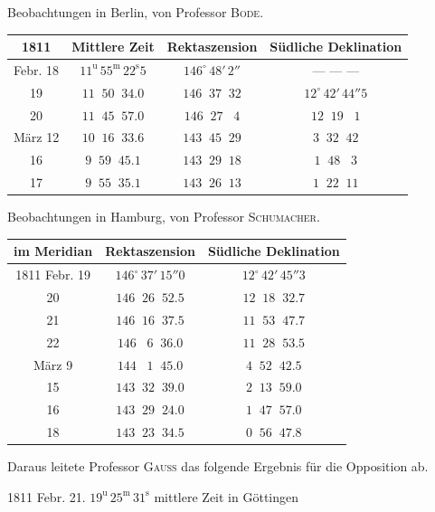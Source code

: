 \begin{center}\fontsize{10}{12}\selectfont\setlength{\tabcolsep}{4pt}\renewcommand{\arraystretch}{1.15}
Beobachtungen in Berlin, von Professor \textsc{Bode}.

\begin{tabular}{c|c|c|c}
1811 & Mittlere Zeit & Rektaszension & Südliche Deklination \\
\hline
Febr. 18 & $11^{\mathrm u}\,55^{\mathrm m}\,22^{\mathrm s}5$ & $146^\circ\,48'\,2''$ & --- --- --- \\
19 & $11\;\;50\;\;34.0$ & $146\;\;37\;\;32$ & $12^\circ\,42'\,44''5$ \\
20 & $11\;\;45\;\;57.0$ & $146\;\;27\;\;\;4$ & $12\;\;19\;\;\;1$ \\
März 12 & $10\;\;16\;\;33.6$ & $143\;\;45\;\;29$ & $3\;\;32\;\;42$ \\
16 & $9\;\;59\;\;45.1$ & $143\;\;29\;\;18$ & $1\;\;48\;\;\;3$ \\
17 & $9\;\;55\;\;35.1$ & $143\;\;26\;\;13$ & $1\;\;22\;\;11$ \\
\end{tabular}
\end{center}

\begin{center}\fontsize{10}{12}\selectfont\setlength{\tabcolsep}{4pt}\renewcommand{\arraystretch}{1.15}
Beobachtungen in Hamburg, von Professor \textsc{Schumacher}.

\begin{tabular}{c|c|c}
im Meridian & Rektaszension & Südliche Deklination \\
\hline
1811 Febr. 19 & $146^\circ\,37'\,15''0$ & $12^\circ\,42'\,45''3$ \\
20 & $146\;\;26\;\;52.5$ & $12\;\;18\;\;32.7$ \\
21 & $146\;\;16\;\;37.5$ & $11\;\;53\;\;47.7$ \\
22 & $146\;\;\;6\;\;36.0$ & $11\;\;28\;\;53.5$ \\
März 9 & $144\;\;\;1\;\;45.0$ & $4\;\;52\;\;42.5$ \\
15 & $143\;\;32\;\;39.0$ & $2\;\;13\;\;59.0$ \\
16 & $143\;\;29\;\;24.0$ & $1\;\;47\;\;57.0$ \\
18 & $143\;\;23\;\;34.5$ & $0\;\;56\;\;47.8$ \\
\end{tabular}
\end{center}


\noindent Daraus leitete Professor \textsc{Gauss} das folgende Ergebnis für die Opposition ab.
\begin{center}1811 Febr. 21. $19^{\mathrm u}\,25^{\mathrm m}\,31^{\mathrm s}$ mittlere Zeit in Göttingen\end{center}

